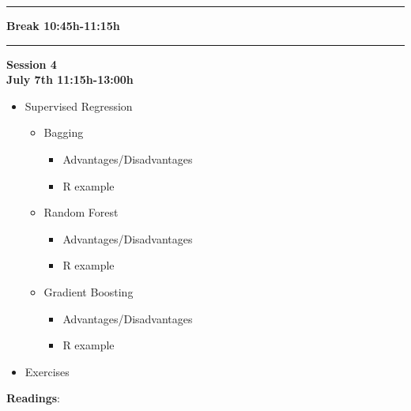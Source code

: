 \documentclass[
]{book}
\providecommand{\tightlist}{%
  \setlength{\itemsep}{0pt}\setlength{\parskip}{0pt}}
\begin{document}
\begin{center}\rule{0.5\linewidth}{\linethickness}\end{center}

\textbf{Break 10:45h-11:15h}

\begin{center}\rule{0.5\linewidth}{\linethickness}\end{center}

\textbf{Session 4}\\
\textbf{July 7th 11:15h-13:00h}

\begin{itemize}
\tightlist
\item
  Supervised Regression

  \begin{itemize}
  \tightlist
  \item
    Bagging

    \begin{itemize}
    \tightlist
    \item
      Advantages/Disadvantages
    \item
      R example
    \end{itemize}
  \item
    Random Forest

    \begin{itemize}
    \tightlist
    \item
      Advantages/Disadvantages
    \item
      R example
    \end{itemize}
  \item
    Gradient Boosting

    \begin{itemize}
    \tightlist
    \item
      Advantages/Disadvantages
    \item
      R example
    \end{itemize}
  \end{itemize}
\item
  Exercises
\end{itemize}

\textbf{Readings}:
\end{document}
